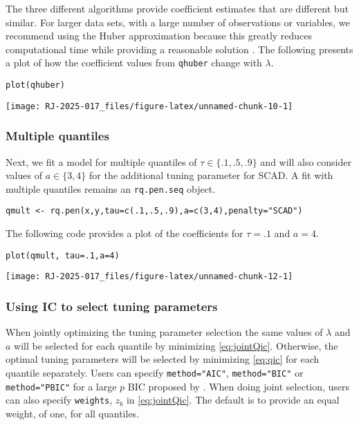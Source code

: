 The three different algorithms provide coefficient estimates that are different but similar. For larger data sets, with a large number of observations or variables, we recommend using the Huber approximation because this greatly reduces computational time while providing a reasonable solution \citep{huber_cd}. The following presents a plot of how the coefficient values from \texttt{qhuber} change with \(\lambda\).

\begin{verbatim}
plot(qhuber)
\end{verbatim}

\begin{center}\texttt{[image: RJ-2025-017\_files/figure-latex/unnamed-chunk-10-1]} \end{center}

\subsubsection{Multiple quantiles}\label{multiple-quantiles}

Next, we fit a model for multiple quantiles of \(\tau \in \{.1,.5,.9\}\) and will also consider values of \(a \in \{3,4\}\) for the additional tuning parameter for SCAD. A fit with multiple quantiles remains an \texttt{rq.pen.seq} object.

\begin{verbatim}
qmult <- rq.pen(x,y,tau=c(.1,.5,.9),a=c(3,4),penalty="SCAD")
\end{verbatim}

The following code provides a plot of the coefficients for \(\tau=.1\) and \(a=4\).

\begin{verbatim}
plot(qmult, tau=.1,a=4)
\end{verbatim}

\begin{center}\texttt{[image: RJ-2025-017\_files/figure-latex/unnamed-chunk-12-1]} \end{center}

\subsubsection{Using IC to select tuning parameters}\label{using-ic-to-select-tuning-parameters}

When jointly optimizing the tuning parameter selection the same values of \(\lambda\) and \(a\) will be selected for each quantile by minimizing \eqref{eq:jointQic}. Otherwise, the optimal tuning parameters will be selected by minimizing \eqref{eq:qic} for each quantile separately. Users can specify \texttt{method="AIC"}, \texttt{method="BIC"} or \texttt{method="PBIC"} for a large \(p\) BIC proposed by \citet{qrbic}. When doing joint selection, users can also specify \texttt{weights}, \(z_b\) in \eqref{eq:jointQic}. The default is to provide an equal weight, of one, for all quantiles.

